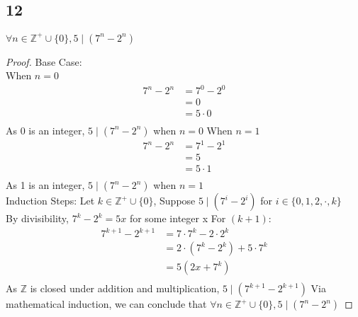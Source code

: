\documentclass{article}
\begin{document}
\subsection{12}
$\forall n \in \mathbb{Z^+} \cup \{0\}, 5 \mid (7^n-2^n)$
\begin{proof}
    Base Case:\\
    When $n = 0$
    \begin{align*}
        7^n-2^n &= 7^0-2^0\tag{By substitution}\\
        &= 0 \\
        &= 5 \cdot 0\tag{By algebra}\\
    \end{align*}
    As 0 is an integer, $5 \mid (7^n-2^n)$ when $n = 0$
    When $n = 1$\\
    \begin{align*}
        7^n-2^n &= 7^1-2^1\tag{By substitution}\\
        &= 5 \\
        &= 5 \cdot 1\tag{By algebra}\\
    \end{align*}
    As 1 is an integer, $5 \mid (7^n-2^n)$ when $n = 1$\\
    Induction Steps:
    Let $k \in \mathbb{Z^+} \cup \{0\}$, Suppose $5 \mid (7^i-2^i)$ for $i \in \{0,1,2,\cdot,k\}$\\
    By divisibility, $7^k-2^k = 5x$ for some integer x
    For $(k + 1)$:\\
    \begin{align*}
        7^{k+1} - 2^{k+1} &= 7 \cdot 7^k - 2 \cdot 2^k\\
        &= 2\cdot(7^k-2^k) + 5 \cdot 7^k \tag{By algebra}\\
        &= 5(2x + 7^k)\\ 
    \end{align*}
    As $\mathbb{Z}$ is closed under addition and multiplication, $5 \mid (7^{k+1} - 2^{k+1})$
    Via mathematical induction, we can conclude that $\forall n \in \mathbb{Z^+} \cup \{0\}, 5 \mid (7^n-2^n)$
\end{proof}
\end{document}
